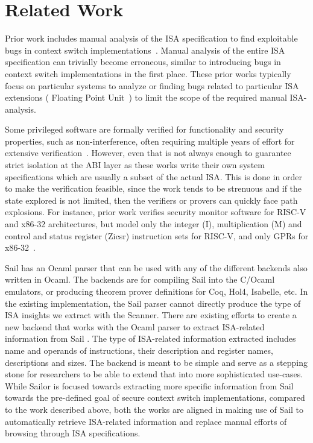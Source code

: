 \section{Related Work}
Prior work includes manual analysis of the ISA specification to find exploitable bugs in context switch implementations~\cite{guard-dilemma, rop-sgx, dtrap-fpu, totw, enclave-isolation}. 
Manual analysis of the entire ISA specification can trivially become erroneous, similar to introducing bugs in context switch implementations in the first place. 
These prior works typically focus on particular systems to analyze or finding bugs related to particular ISA extensions (\eg{} Floating Point Unit~\cite{dtrap-fpu}) to limit the scope of the required manual ISA-analysis. 

Some privileged software are formally verified for functionality and security properties, such as non-interference, often requiring multiple years of effort for extensive verification~\cite{sel4, certikos, komodo}. 
However, even that is not always enough to guarantee strict isolation at the ABI layer as these works write their own system specifications which are usually a subset of the actual ISA. 
This is done in order to make the verification feasible, since the work tends to be strenuous and if the state explored is not limited, then the verifiers or provers can quickly face path explosions. 
For instance, prior work verifies security monitor software for RISC-V and x86-32 architectures, but model only the integer (I), multiplication (M) and control and status register (Zicsr) instruction sets for RISC-V, and only GPRs for x86-32~\cite{serval}. 

Sail has an Ocaml parser that can be used with any of the different backends also written in Ocaml. 
The backends are for compiling Sail into the C/Ocaml emulators, or producing theorem prover definitions for Coq, Hol4, Isabelle, etc. 
In the existing implementation, the Sail parser cannot directly produce the type of ISA insights we extract with the Scanner. 
There are existing efforts to create a new backend that works with the Ocaml parser to extract ISA-related information from Sail \cite{thinkopenly}. 
The type of ISA-related information extracted includes name and operands of instructions, their description and register names, descriptions and sizes. 
The backend is meant to be simple and serve as a stepping stone for researchers to be able to extend that into more sophisticated use-cases. 
While Sailor is focused towards extracting more specific information from Sail towards the pre-defined goal of secure context switch implementations, compared to the work described above, both the works are aligned in making use of Sail to automatically retrieve ISA-related information and replace manual efforts of browsing through ISA specifications. 

